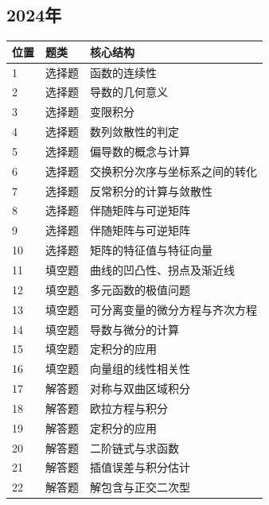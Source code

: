 \subsection*{2024年}
\begin{longtable}{p{9mm}p{25mm}p{109mm}}\toprule 位置&题类&核心结构\\\midrule\endhead
1&选择题&函数的连续性\\
2&选择题&导数的几何意义\\
3&选择题&变限积分\\
4&选择题&数列敛散性的判定\\
5&选择题&偏导数的概念与计算\\
6&选择题&交换积分次序与坐标系之间的转化\\
7&选择题&反常积分的计算与敛散性\\
8&选择题&伴随矩阵与可逆矩阵\\
9&选择题&伴随矩阵与可逆矩阵\\
10&选择题&矩阵的特征值与特征向量\\
11&填空题&曲线的凹凸性、拐点及渐近线\\
12&填空题&多元函数的极值问题\\
13&填空题&可分离变量的微分方程与齐次方程\\
14&填空题&导数与微分的计算\\
15&填空题&定积分的应用\\
16&填空题&向量组的线性相关性\\
17&解答题&对称与双曲区域积分\\
18&解答题&欧拉方程与积分\\
19&解答题&定积分的应用\\
20&解答题&二阶链式与求函数\\
21&解答题&插值误差与积分估计\\
22&解答题&解包含与正交二次型\\
\bottomrule\end{longtable}
